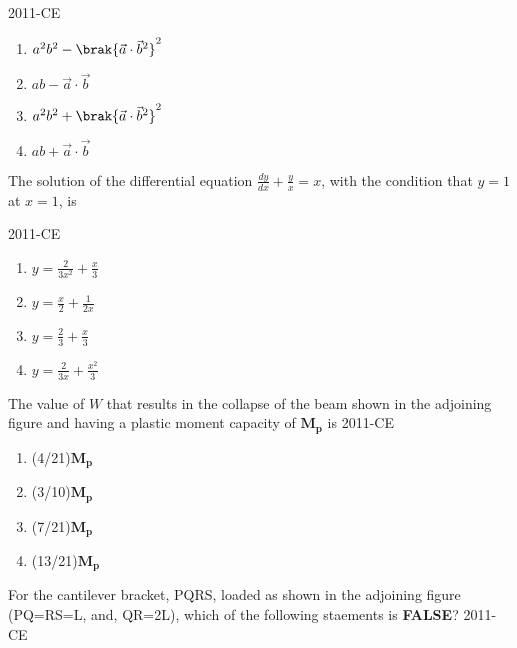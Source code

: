 	\hfill{2011-CE}

	\begin{multicols}{4}
	\begin{enumerate}
		\item $a^{2}b^{2}-\brak{\vec{a} \cdot \vec{b}^2}^{2}$
		\item $ab-\vec{a} \cdot \vec{b}$
		\item $a^{2}b^{2}+\brak{\vec{a} \cdot \vec{b}^2}^{2}$
		\item $ab+\vec{a} \cdot \vec{b}$
	\end{enumerate}
	\end{multicols}

\item The solution of the differential equation $\frac{dy}{dx}+\frac{y}{x}=x$, with the condition that $y=1$ at $x=1$, is

	\hfill{2011-CE}

	\begin{multicols}{4}
	\begin{enumerate}
		\item $y=\frac{2}{3x^{2}}+\frac{x}{3}$
		\item $y=\frac{x}{2}+\frac{1}{2x}$
 		\item $y=\frac{2}{3}+\frac{x}{3}$
		\item $y=\frac{2}{3x}+\frac{x^{2}}{3}$
	\end{enumerate}
	\end{multicols}

\item The value of $W$ that results in the collapse of the beam shown in the adjoining figure and having a plastic moment capacity of $\mathbf{M_{p}}$ is
	\hfill{2011-CE}

\begin{figure}[ht]
\centering

\end{figure}


	\begin{multicols}{4}
	\begin{enumerate}
		\item (4/21)$\mathbf{M_{p}}$
		\item (3/10)$\mathbf{M_{p}}$
		\item (7/21)$\mathbf{M_{p}}$
		\item (13/21)$\mathbf{M_{p}}$
	\end{enumerate}
	\end{multicols}

\item For the cantilever bracket, PQRS, loaded as shown in the adjoining figure (PQ=RS=L, and, QR=2L), which of the following staements is \textbf{FALSE}?
	\hfill{2011-CE}

